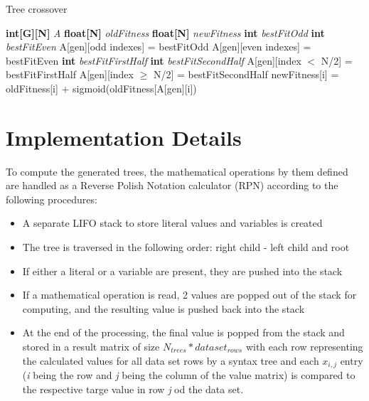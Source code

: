 \documentclass[runningheads]{llncs}
\begin{document}
\begin{algorithm}
\caption{Tree crossover}
\begin{algorithmic}[1]
\State \textbf{int[G][N]} \textit{A}
\State \textbf{float[N]} \textit{oldFitness}
\State \textbf{float[N]} \textit{newFitness}
\EndFor
{}
	\State \textbf{int} \textit{bestFitOdd}
	\State \textbf{int} \textit{bestFitEven} 
	\EndFor
	\State A[gen][odd indexes] = bestFitOdd
	\State A[gen][even indexes] = bestFitEven
\Else
	\State \textbf{int} \textit{bestFitFirstHalf}
	\State \textbf{int} \textit{bestFitSecondHalf}
	\EndFor
	\State A[gen][index $<$ N/2] = bestFitFirstHalf
	\State A[gen][index $\geq$ N/2] = bestFitSecondHalf
\EndIf
{}
	\State newFitness[i] = oldFitness[i] + sigmoid(oldFitness[A[gen][i])
\EndFor
\EndFor
\EndProcedure
\end{algorithmic}
\label{crossover_alg}
\end{algorithm}


\section{Implementation Details}
To compute the generated trees, the mathematical operations by them defined are handled as a Reverse Polish Notation calculator (RPN) according to the following procedures:
\begin{itemize}
	\item A separate LIFO stack to store literal values and variables is created
	\item The tree is traversed in the following order: right child - left child and root
	\item If either a literal or a variable are present, they are pushed into the stack
	\item If a mathematical operation is read, 2 values are popped out of the stack for computing, and the resulting value is pushed back into the stack
	\item At the end of the processing, the final value is popped from the stack and stored in a result matrix of size $N_{trees}*dataset_{rows}$ with each row representing the calculated values for all data set rows by a syntax tree and each $x_{i,j}$ entry (\textit{i} being the row and \textit{j} being the column of the value matrix) is compared to the respective targe value in row \textit{j} od the data set.
\end{itemize}
\end{document}
